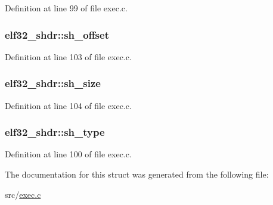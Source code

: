 Definition at line 99 of file exec.\+c.

\hypertarget{structelf32__shdr_a4dea3a6fbd3a62a649d327b515c70cd6}{
\subsubsection[{sh\+\_\+offset}]{ elf32\+\_\+shdr\+::sh\+\_\+offset}}\label{structelf32__shdr_a4dea3a6fbd3a62a649d327b515c70cd6}


Definition at line 103 of file exec.\+c.

\hypertarget{structelf32__shdr_a4addb97e16e7303912fc84daa6f3ac77}{
\subsubsection[{sh\+\_\+size}]{ elf32\+\_\+shdr\+::sh\+\_\+size}}\label{structelf32__shdr_a4addb97e16e7303912fc84daa6f3ac77}


Definition at line 104 of file exec.\+c.

\hypertarget{structelf32__shdr_ab82e07582eb07fc53eec4dca36dddc83}{
\subsubsection[{sh\+\_\+type}]{ elf32\+\_\+shdr\+::sh\+\_\+type}}\label{structelf32__shdr_ab82e07582eb07fc53eec4dca36dddc83}


Definition at line 100 of file exec.\+c.



The documentation for this struct was generated from the following file\+:\begin{DoxyCompactItemize}
\item 
src/\hyperlink{exec_8c}{exec.\+c}\end{DoxyCompactItemize}
